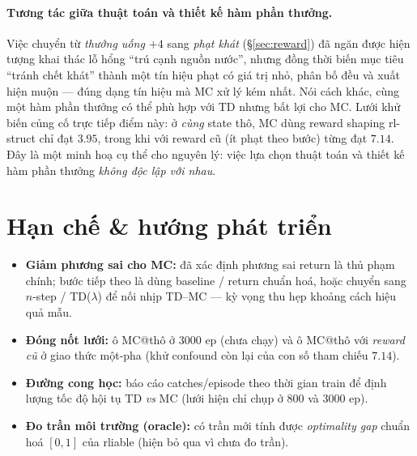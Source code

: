 \documentclass[11pt,a4paper]{article}
\begin{document}
\paragraph{Tương tác giữa thuật toán và thiết kế hàm phần thưởng.} Việc chuyển từ \emph{thưởng uống
$+4$} sang \emph{phạt khát} (\S\ref{sec:reward}) đã ngăn được hiện tượng khai thác lỗ hổng ``trú
cạnh nguồn nước'', nhưng đồng thời biến mục tiêu ``tránh chết khát'' thành một tín hiệu phạt có giá
trị nhỏ, phân bố đều và xuất hiện muộn --- đúng dạng tín hiệu mà MC xử lý kém nhất. Nói cách khác,
cùng một hàm phần thưởng có thể phù hợp với TD nhưng bất lợi cho MC. Lưới khử biến củng cố trực tiếp
điểm này: ở \emph{cùng} state thô, MC dùng reward shaping rl-struct chỉ đạt $3.95$, trong khi với
reward cũ (ít phạt theo bước) từng đạt $7.14$. Đây là một minh hoạ cụ thể cho nguyên lý: việc lựa
chọn thuật toán và thiết kế hàm phần thưởng \emph{không độc lập với nhau}.

\section{Hạn chế \& hướng phát triển}
\begin{itemize}[leftmargin=1.4em,itemsep=1pt]
  \item \textbf{Giảm phương sai cho MC:} đã xác định phương sai return là thủ phạm chính; bước tiếp
        theo là dùng baseline / return chuẩn hoá, hoặc chuyển sang $n$-step / TD($\lambda$) để nối
        nhịp TD--MC --- kỳ vọng thu hẹp khoảng cách hiệu quả mẫu.
  \item \textbf{Đóng nốt lưới:} ô MC@thô ở $3000$ ep (chưa chạy) và ô MC@thô với \emph{reward cũ}
        ở giao thức một-pha (khử confound còn lại của con số tham chiếu $7.14$).
  \item \textbf{Đường cong học:} báo cáo catches/episode theo thời gian train để định lượng tốc độ
        hội tụ TD \emph{vs} MC (lưới hiện chỉ chụp ở $800$ và $3000$ ep).
  \item \textbf{Đo trần môi trường (oracle):} có trần mới tính được \emph{optimality gap} chuẩn hoá
        $[0,1]$ của rliable (hiện bỏ qua vì chưa đo trần).
\end{itemize}

\end{document}
